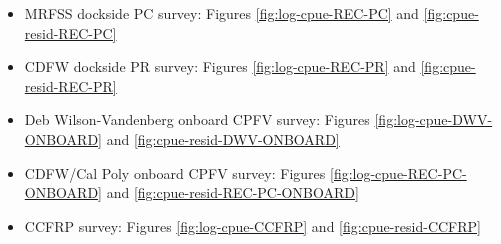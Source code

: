 \documentclass[11pt,
  english,
]{article}
\begin{document}
\begin{itemize}
\item

  MRFSS dockside PC survey: Figures \ref{fig:log-cpue-REC-PC} and \ref{fig:cpue-resid-REC-PC}

  \tagmcend\tagstructend\tagstructend
\item

  CDFW dockside PR survey: Figures \ref{fig:log-cpue-REC-PR} and \ref{fig:cpue-resid-REC-PR}

  \tagmcend\tagstructend\tagstructend
\item

  Deb Wilson-Vandenberg onboard CPFV survey: Figures \ref{fig:log-cpue-DWV-ONBOARD} and \ref{fig:cpue-resid-DWV-ONBOARD}\\

  \tagmcend\tagstructend\tagstructend
\item

  CDFW/Cal Poly onboard CPFV survey: Figures \ref{fig:log-cpue-REC-PC-ONBOARD} and \ref{fig:cpue-resid-REC-PC-ONBOARD}

  \tagmcend\tagstructend\tagstructend
\item

  CCFRP survey: Figures \ref{fig:log-cpue-CCFRP} and \ref{fig:cpue-resid-CCFRP}

  \tagmcend\tagstructend\tagstructend
\end{itemize}

\tagstructend
\end{document}
